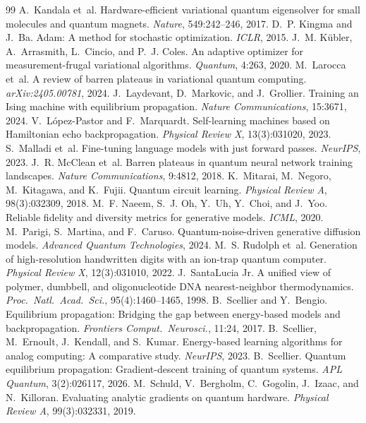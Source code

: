 \documentclass[11pt]{article}
\begin{document}
\begin{thebibliography}{99}
 A.~Kandala et~al. Hardware-efficient variational quantum eigensolver for small molecules and quantum magnets. {\em Nature}, 549:242--246, 2017.
 D.~P. Kingma and J.~Ba. Adam: A method for stochastic optimization. {\em ICLR}, 2015.
 J.~M. K{\"u}bler, A.~Arrasmith, L.~Cincio, and P.~J. Coles. An adaptive optimizer for measurement-frugal variational algorithms. {\em Quantum}, 4:263, 2020.
 M.~Larocca et~al. A review of barren plateaus in variational quantum computing. {\em arXiv:2405.00781}, 2024.
 J.~Laydevant, D.~Markovic, and J.~Grollier. Training an Ising machine with equilibrium propagation. {\em Nature Communications}, 15:3671, 2024.
 V.~L{\'o}pez-Pastor and F.~Marquardt. Self-learning machines based on Hamiltonian echo backpropagation. {\em Physical Review X}, 13(3):031020, 2023.
 S.~Malladi et~al. Fine-tuning language models with just forward passes. {\em NeurIPS}, 2023.
 J.~R. McClean et~al. Barren plateaus in quantum neural network training landscapes. {\em Nature Communications}, 9:4812, 2018.
 K.~Mitarai, M.~Negoro, M.~Kitagawa, and K.~Fujii. Quantum circuit learning. {\em Physical Review A}, 98(3):032309, 2018.
 M.~F. Naeem, S.~J. Oh, Y.~Uh, Y.~Choi, and J.~Yoo. Reliable fidelity and diversity metrics for generative models. {\em ICML}, 2020.
 M.~Parigi, S.~Martina, and F.~Caruso. Quantum-noise-driven generative diffusion models. {\em Advanced Quantum Technologies}, 2024.
 M.~S. Rudolph et~al. Generation of high-resolution handwritten digits with an ion-trap quantum computer. {\em Physical Review X}, 12(3):031010, 2022.
 J.~SantaLucia Jr. A unified view of polymer, dumbbell, and oligonucleotide DNA nearest-neighbor thermodynamics. {\em Proc.\ Natl.\ Acad.\ Sci.}, 95(4):1460--1465, 1998.
 B.~Scellier and Y.~Bengio. Equilibrium propagation: Bridging the gap between energy-based models and backpropagation. {\em Frontiers Comput.\ Neurosci.}, 11:24, 2017.
 B.~Scellier, M.~Ernoult, J.~Kendall, and S.~Kumar. Energy-based learning algorithms for analog computing: A comparative study. {\em NeurIPS}, 2023.
 B.~Scellier. Quantum equilibrium propagation: Gradient-descent training of quantum systems. {\em APL Quantum}, 3(2):026117, 2026.
 M.~Schuld, V.~Bergholm, C.~Gogolin, J.~Izaac, and N.~Killoran. Evaluating analytic gradients on quantum hardware. {\em Physical Review A}, 99(3):032331, 2019.

\end{thebibliography}
\end{document}
